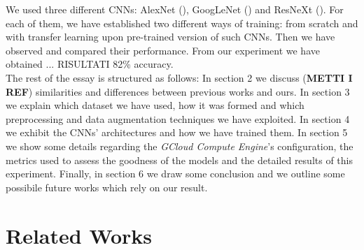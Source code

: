 \documentclass{article}
\begin{document}
We used three different CNNs: AlexNet (\cite{alexnet}), GoogLeNet (\cite{googlenet}) and ResNeXt (\cite{resneXt}). For each of them, we have established two different ways of training: from scratch and with transfer learning  upon pre-trained version of such CNNs. Then we have observed and compared their performance. From our experiment we have obtained ... RISULTATI 82\% accuracy.\\

The rest of the essay is structured as follows: In section 2 we discuss (\textbf{METTI I REF}) similarities and differences between previous works and ours. In section 3 we explain which dataset we have used, how it was formed and which preprocessing and data augmentation techniques we have exploited. In section 4 we exhibit the CNNs' architectures and how we have trained them. In section 5 we show some details regarding the \textit{GCloud Compute Engine}'s configuration, the metrics used to assess the goodness of the models and the detailed results of this experiment. Finally, in section 6 we draw some conclusion and we outline some possibile future works which rely on our result.


\section{Related Works}
\end{document}
